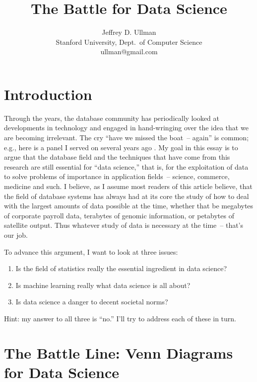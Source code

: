 \documentclass[11pt]{article}
\begin{document}
\title{The Battle for Data Science}
\author{Jeffrey D. Ullman\\Stanford University, Dept.\ of Computer Science\\ullman@gmail.com}


\section{Introduction}

Through the years, the database community has periodically looked at developments in technology and engaged in hand-wringing over the idea that we are becoming irrelevant.  The cry ``have we missed the boat~-- again'' is common; e.g., here is a panel I served on several years ago \cite{boat}.
My goal in this essay is to argue that the database field and the techniques that have come from this research are still essential for ``data science,'' that is, for the exploitation of data to solve problems of importance in application fields~-- science, commerce, medicine and such.  I believe, as I assume most readers of this article believe, that the field of database systems has always had at its core the study of how to deal with the largest amounts of data possible at the time, whether that be megabytes of corporate payroll data, terabytes of genomic information, or petabytes of satellite output.  Thus whatever study of data is necessary at the time~-- that's our job.

To advance this argument, I want to look at three issues:

\begin{enumerate}

\item
Is the field of statistics really the essential ingredient in data science?

\item
Is machine learning really what data science is all about?

\item
Is data science a danger to decent societal norms?

\end{enumerate}
Hint: my answer to all three is ``no.''  I'll try to address each of these in turn.

\section{The Battle Line: Venn Diagrams for Data Science}
\end{document}
